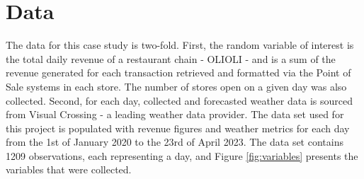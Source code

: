 \section{Data}
The data for this case study is two-fold. First, the random variable of
interest is the total daily revenue of a restaurant chain - OLIOLI - and is a
sum of the revenue generated for each transaction retrieved and formatted via
the Point of Sale systems in each store. The number of stores open on a given
day was also collected. Second, for each day, collected and forecasted weather
data is sourced from Visual Crossing - a leading weather data provider. The
data set used for this project is populated with revenue figures and weather
metrics for each day from the 1st of January 2020 to the 23rd of April 2023.
The data set contains 1209 observations, each representing a day, and Figure
\ref{fig:variables} presents the variables that were collected.
